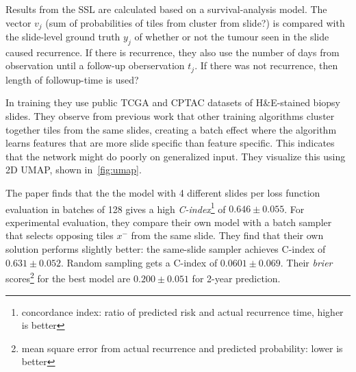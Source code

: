 \documentclass[10pt,twocolumn,letterpaper]{article}
\begin{document}

Results from the \gls{SSL} are calculated based on a survival-analysis model. The vector $v_{j}$ (sum of probabilities of tiles from cluster from slide?) is compared with the slide-level ground truth $y_{j}$ of whether or not the tumour seen in the slide caused recurrence. If there is recurrence, they also use the number of days from observation until a follow-up oberservation $t_{j}$. If there was not recurrence, then length of followup-time is used? %

In training they use public TCGA and CPTAC datasets of H\&E-stained biopsy slides. They observe from previous work that other training algorithms cluster together tiles from the same slides, creating a batch effect where the algorithm learns features that are more slide specific than feature specific. This indicates that the network might do poorly on generalized input. They visualize this using 2D \gls{UMAP}, shown in~\cref{fig:umap}.

The paper finds that the the model with 4 different slides per loss function evaluation in batches of 128 gives a high \textit{C-index}\footnote{concordance index: ratio of predicted risk and actual recurrence time, higher is better} of $0.646 \pm 0.055$. For experimental evaluation, they compare their own model with a batch sampler that selects opposing tiles $x^{-}$ from the same slide. They find that their own solution performs slightly better: the same-slide sampler achieves C-index of $0.631 \pm 0.052$. Random sampling gets a C-index of $0.0601 \pm 0.069$. Their \textit{brier} scores\footnote{mean square error from actual recurrence and predicted probability: lower is better} for the best model are $0.200 \pm 0.051$ for 2-year prediction.
\end{document}
